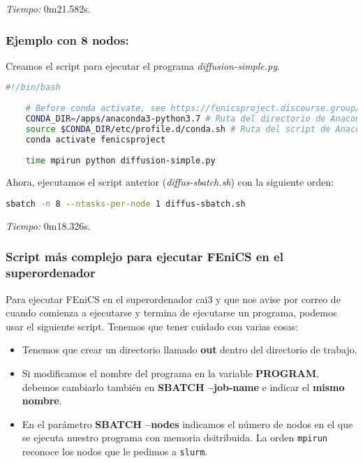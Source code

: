 \textit{Tiempo:} 0m21.582s.

\subsubsection*{Ejemplo con 8 nodos:}
Creamos el script para ejecutar el programa \textit{diffusion-simple.py}.
\begin{lstlisting}[language=sh]
	#!/bin/bash
	
	# Before conda activate, see https://fenicsproject.discourse.group/t/fenics-from-conda-doesnt-import/3502/6
	CONDA_DIR=/apps/anaconda3-python3.7 # Ruta del directorio de Anaconda
	source $CONDA_DIR/etc/profile.d/conda.sh # Ruta del script de Anaconda
	conda activate fenicsproject
	
	time mpirun python diffusion-simple.py
\end{lstlisting}

Ahora, ejecutamos el script anterior (\textit{diffus-sbatch.sh}) con la siguiente orden:
\begin{lstlisting}[language=sh]
	sbatch -n 8 --ntasks-per-node 1 diffus-sbatch.sh
\end{lstlisting}

\textit{Tiempo:} 0m18.326s.

\subsubsection*{Script más complejo para ejecutar FEniCS en el superordenador}
Para ejecutar FEniCS en el superordenador cai3 y que nos avise por correo de cuando comienza a ejecutarse y termina de ejecutarse un programa, podemos usar el siguiente script. Tenemos que tener cuidado con varias cosas:
\begin{itemize}
	\item Tenemos que crear un directorio llamado \textbf{out} dentro del directorio de trabajo.
	\item Si modificamos el nombre del programa en la variable \textbf{PROGRAM}, debemos cambiarlo también en \textbf{SBATCH --job-name} e indicar el \textbf{mismo nombre}.
	\item En el parámetro \textbf{SBATCH --nodes} indicamos el número de nodos en el que se ejecuta nuestro programa con memoria dsitribuida. La orden \texttt{mpirun} reconoce los nodos que le pedimos a \texttt{slurm}.
\end{itemize}

